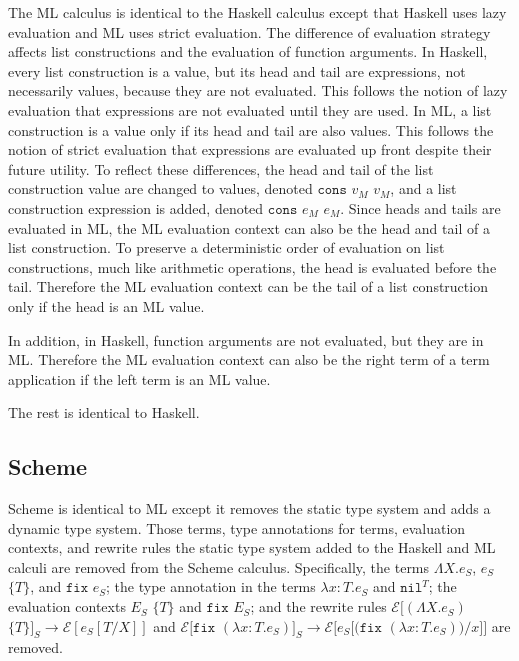 The ML calculus is identical to the Haskell calculus except that Haskell uses lazy evaluation and ML uses strict evaluation.  The difference of evaluation strategy affects list constructions and the evaluation of function arguments.  In Haskell, every list construction is a value, but its head and tail are expressions, not necessarily values, because they are not evaluated.  This follows the notion of lazy evaluation that expressions are not evaluated until they are used.  In ML, a list construction is a value only if its head and tail are also values.  This follows the notion of strict evaluation that expressions are evaluated up front despite their future utility.  To reflect these differences, the head and tail of the list construction value are changed to values, denoted $\mathtt{cons}$ $v_{M}$ $v_{M}$, and a list construction expression is added, denoted $\mathtt{cons}$ $e_{M}$ $e_{M}$.  Since heads and tails are evaluated in ML, the ML evaluation context can also be the head and tail of a list construction.  To preserve a deterministic order of evaluation on list constructions, much like arithmetic operations, the head is evaluated before the tail.  Therefore the ML evaluation context can be the tail of a list construction only if the head is an ML value.  

In addition, in Haskell, function arguments are not evaluated, but they are in ML.  Therefore the ML evaluation context can also be the right term of a term application if the left term is an ML value.

The rest is identical to Haskell.

\subsection{Scheme}

Scheme is identical to ML except it removes the static type system and adds a dynamic type system.  Those terms, type annotations for terms, evaluation contexts, and rewrite rules the static type system added to the Haskell and ML calculi are removed from the Scheme calculus.  Specifically, the terms $\Lambda X.e_{S}$, $e_{S}$ $\lbrace T\rbrace$, and $\mathtt{fix}$ $e_{S}$; the type annotation in the terms $\lambda x:T.e_{S}$ and $\mathtt{nil}^{T}$; the evaluation contexts $E_{S}$ $\lbrace T\rbrace$ and $\mathtt{fix}$ $E_{S}$; and the rewrite rules $\mathscr{E}[(\Lambda X.e_{S})$ $\lbrace T\rbrace]_{S}\rightarrow\mathscr{E}[e_{S}[T/X]]$ and $\mathscr{E}[\mathtt{fix}$ $(\lambda x:T.e_{S})]_{S}\rightarrow\mathscr{E}[e_{S}[(\mathtt{fix}$ $(\lambda x:T.e_{S}))/x]]$ are removed.

